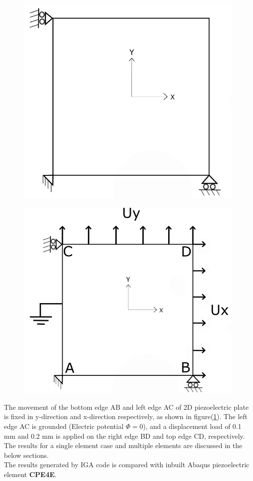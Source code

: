 \documentclass[11pt]{article}
\begin{document}
\begin{figure}[H]
	\centering
	\begin{minipage}{.5\textwidth}
		\centering
		\includegraphics[width=0.8\linewidth]{2DPlate.png}
		\label{2Dplate}
	\end{minipage}%
	\begin{minipage}{.5\textwidth}
		\centering
		\includegraphics[width=1\linewidth]{Grounded.png}
		\label{EMLoading}
	\end{minipage}
\end{figure}
The movement of the bottom edge AB and left edge AC of 2D piezoelectric plate is fixed in y-direction and x-direction respectively, as shown in figure(\ref{EMLoading}).
The left edge AC is grounded (Electric potential $\Phi = 0$), and a displacement load of 0.1 mm and 0.2 mm is applied on the right edge BD and top edge CD, respectively. The results for a single element case and multiple elements are discussed in the below
sections. \\
The results generated by IGA code is compared with inbuilt Abaqus piezoelectric
element \textbf{CPE4E}.
\end{document}
